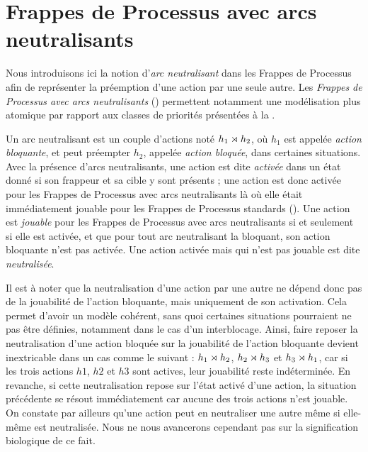 \section{Frappes de Processus avec arcs neutralisants}

Nous introduisons ici la notion d'\emph{arc neutralisant} dans les Frappes de Processus
afin de représenter la préemption d'une action par une seule autre.
Les \emph{Frappes de Processus avec arcs neutralisants} ()
permettent notamment une modélisation plus atomique
par rapport aux classes de priorités présentées à la .

Un arc neutralisant est un couple d'actions noté $h_1\rtimes h_2$,
où $h_1$ est appelée \emph{action bloquante},
et peut préempter $h_2$, appelée \emph{action bloquée},
dans certaines situations.
Avec la présence d'arcs neutralisants, une action est dite \emph{activée} dans un état donné si
son frappeur et sa cible y sont présents ;
une action est donc activée pour les Frappes de Processus avec arcs neutralisants
là où elle était immédiatement jouable pour les Frappes de Processus standards ().
Une action est \emph{jouable} pour les Frappes de Processus avec arcs neutralisants
si et seulement si elle est activée,
et que pour tout arc neutralisant la bloquant, son action bloquante n'est pas activée.
Une action activée mais qui n'est pas jouable est dite \emph{neutralisée}.

Il est à noter que la neutralisation d'une action par une autre ne dépend donc pas de la jouabilité
de l'action bloquante, mais uniquement de son activation.
Cela permet d'avoir un modèle cohérent, sans quoi certaines situations pourraient ne pas être
définies, notamment dans le cas d'un interblocage.
Ainsi, faire reposer la neutralisation d'une action bloquée sur la jouabilité de l'action bloquante
devient inextricable dans un cas comme le suivant :
$h_1\rtimes h_2$, $h_2\rtimes h_3$ et $h_3\rtimes h_1$,
car si les trois actions $h1$, $h2$ et $h3$ sont actives, leur jouabilité reste indéterminée.
En revanche, si cette neutralisation repose sur l'état activé d'une action,
la situation précédente se résout immédiatement car aucune des trois actions n'est jouable.
On constate par ailleurs qu'une action peut en neutraliser une autre
même si elle-même est neutralisée.
Nous ne nous avancerons cependant pas sur la signification biologique de ce fait.

